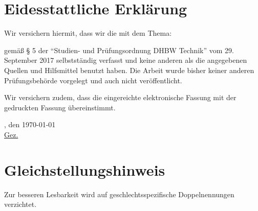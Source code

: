 \section*{Eidesstattliche Erklärung}
Wir versichern hiermit, dass wir die \arbeit{} mit dem Thema:
\begin{quote}
	\textit{\titel}
\end{quote} 
gemäß § 5 der \enquote{Studien- und Prüfungsordnung DHBW Technik} vom 29. September 2017 selbstständig verfasst und keine anderen als die angegebenen Quellen und Hilfsmittel benutzt haben. Die Arbeit wurde bisher keiner anderen Prüfungsbehörde vorgelegt und auch nicht veröffentlicht.

\vspace{0.25cm}

Wir versichern zudem, dass die eingereichte elektronische Fassung mit der gedruckten Fassung übereinstimmt.

\vspace{1cm}

\verfassungsort, den \today \\[0.5cm]
	{\underline{Gez. \autor}}
	{\makebox[6cm]{\hrulefill}}\\ 
\autorReverse

\vspace*{\fill}

\section*{Gleichstellungshinweis}

Zur besseren Lesbarkeit wird auf geschlechtsspezifische Doppelnennungen verzichtet.
